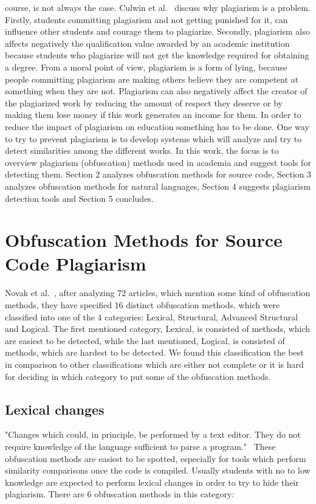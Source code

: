 \documentclass[12pt]{article}
\begin{document}
course, is not always the case. Culwin et al.~\cite{plagiarismIssues} discuss why plagiarism is a problem. Firstly, students committing plagiarism and not getting punished for it, can influence other students and courage them to plagiarize. Secondly, plagiarism also affects negatively the qualification value awarded by an academic institution because students who plagiarize will not get the knowledge required for obtaining a degree. From a moral point of view, plagiarism is a form of lying, because people committing plagiarism are making others believe they are competent at something when they are not. Plagiarism can also negatively affect the creator of the plagiarized work by reducing the amount of respect they deserve or by making them lose money if this work generates an income for them. In order to reduce the impact of plagiarism on education something has to be done. One way to try to prevent plagiarism is to develop systems which will analyze and try to detect similarities among the different works. In this work, the focus is to overview plagiarism (obfuscation) methods used in academia and suggest tools for detecting them. Section 2 analyzes obfuscation methods for source code, Section 3 analyzes obfuscation methods for natural languages, Section 4 suggests plagiarism detection tools and Section 5 concludes.


\section{Obfuscation Methods for Source Code Plagiarism} \label{sec:Obfuscation Methods for Source Code Plagiarism}
 
Novak et al.~\cite{novak}, after analyzing 72 articles, which mention some kind of obfuscation methods, they have specified 16 distinct obfuscation methods, which were classified into one of the 4 categories: Lexical, Structural, Advanced Structural and Logical. The first mentioned category, Lexical, is consisted of methods, which are easiest to be detected, while the last mentioned, Logical, is consisted of methods, which are hardest to be detected. We found this classification the best in comparison to other classifications which are either not complete or it is hard for deciding in which category to put some of the obfuscation methods.


\subsection{Lexical changes} \label{sec:Lexical changes}
"Changes which could, in principle, be performed by a text editor. They do not require knowledge of the language sufficient to parse a program."~\cite{joyUndLuck} These obfuscation methods are easiest to be spotted, especially for tools which perform similarity comparisons once the code is compiled. Usually students with no to low knowledge are expected to perform lexical changes in order to try to hide their plagiarism. There are 6 obfuscation methods in this category: 
\end{document}
